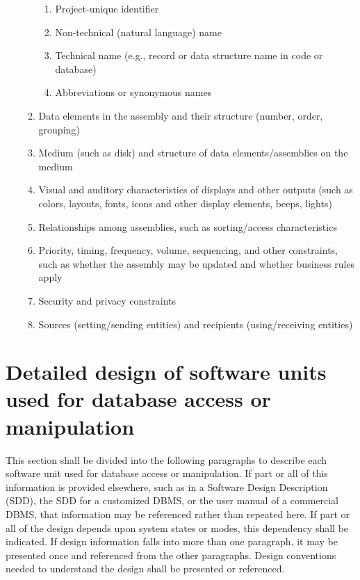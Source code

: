 \documentclass{fidata-report-template}
\begin{document}
\begin{enumerate}
\begin{enumerate}
    \begin{enumerate}
    \itemsep1pt\parskip0pt
    \item
      Project-unique identifier
    \item
      Non-technical (natural language) name
    \item
      Technical name (e.g., record or data structure name in code or
      database)
    \item
      Abbreviations or synonymous names
    \end{enumerate}
  \item
    Data elements in the assembly and their structure (number, order,
    grouping)
  \item
    Medium (such as disk) and structure of data elements/assemblies on
    the medium
  \item
    Visual and auditory characteristics of displays and other outputs
    (such as colors, layouts, fonts, icons and other display elements,
    beeps, lights)
  \item
    Relationships among assemblies, such as sorting/access
    characteristics
  \item
    Priority, timing, frequency, volume, sequencing, and other
    constraints, such as whether the assembly may be updated and whether
    business rules apply
  \item
    Security and privacy constraints
  \item
    Sources (setting/sending entities) and recipients (using/receiving
    entities)
  \end{enumerate}
\end{enumerate}

\section{Detailed design of software units used for database access
or manipulation}

This section shall be divided into the following paragraphs to describe
each software unit used for database access or manipulation. If part or
all of this information is provided elsewhere, such as in a Software
Design Description (SDD), the SDD for a customized DBMS, or the user
manual of a commercial DBMS, that information may be referenced rather
than repeated here. If part or all of the design depends upon system
states or modes, this dependency shall be indicated. If design
information falls into more than one paragraph, it may be presented once
and referenced from the other paragraphs. Design conventions needed to
understand the design shall be presented or referenced.
\end{document}
